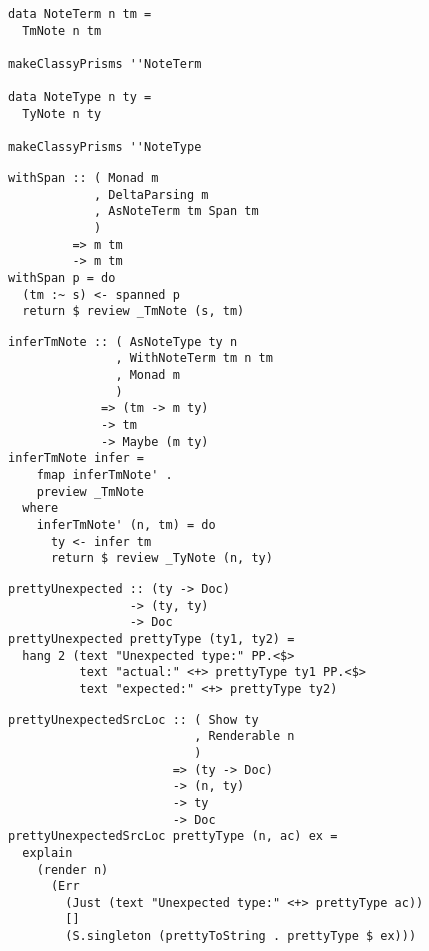 \documentclass{beamer}
\begin{document}
\begin{frame}[fragile]
  \begin{verbatim}
data NoteTerm n tm =
  TmNote n tm

makeClassyPrisms ''NoteTerm

data NoteType n ty =
  TyNote n ty

makeClassyPrisms ''NoteType
  \end{verbatim}
\end{frame} 

\begin{frame}[fragile]
  \begin{verbatim}
withSpan :: ( Monad m
            , DeltaParsing m
            , AsNoteTerm tm Span tm
            )
         => m tm
         -> m tm
withSpan p = do
  (tm :~ s) <- spanned p
  return $ review _TmNote (s, tm)
  \end{verbatim}
\end{frame} 

\begin{frame}[fragile]
  \begin{verbatim}
inferTmNote :: ( AsNoteType ty n
               , WithNoteTerm tm n tm
               , Monad m
               )
             => (tm -> m ty)
             -> tm
             -> Maybe (m ty)
inferTmNote infer =
    fmap inferTmNote' .
    preview _TmNote
  where
    inferTmNote' (n, tm) = do
      ty <- infer tm
      return $ review _TyNote (n, ty)
  \end{verbatim}
\end{frame} 

\begin{frame}[fragile]
  \begin{verbatim}
prettyUnexpected :: (ty -> Doc)
                 -> (ty, ty)
                 -> Doc
prettyUnexpected prettyType (ty1, ty2) =
  hang 2 (text "Unexpected type:" PP.<$>
          text "actual:" <+> prettyType ty1 PP.<$>
          text "expected:" <+> prettyType ty2)
  \end{verbatim}
\end{frame} 

\begin{frame}[fragile]
  \begin{verbatim}
prettyUnexpectedSrcLoc :: ( Show ty
                          , Renderable n
                          )
                       => (ty -> Doc)
                       -> (n, ty)
                       -> ty
                       -> Doc
prettyUnexpectedSrcLoc prettyType (n, ac) ex =
  explain
    (render n)
      (Err 
        (Just (text "Unexpected type:" <+> prettyType ac)) 
        [] 
        (S.singleton (prettyToString . prettyType $ ex)))
  \end{verbatim}
\end{frame} 
\end{document}
